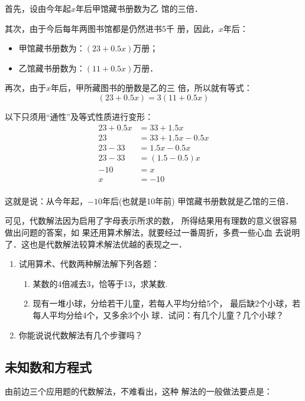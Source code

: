 \begin{solution}
首先，设由今年起$x$年后甲馆藏书册数为乙
馆的三倍．

    其次，由于今后每年两图书馆都是仍然进书5千
册，因此，$x$年后：
\begin{itemize}
    \item 甲馆藏书册数为：$(23 + 0. 5x)$万册；
    \item  乙馆藏书册数为：$(11+0.5x)$万册．
\end{itemize}

    再次，由于$x$年后，甲所藏图书的册数是乙的三
倍，所以就有等式：
\[(23 + 0. 5x)=3(11+0.5x) \]

以下只须用“通性”及等式性质进行变形：
\begin{align*}
    23 + 0. 5x& =33+1.5x \tag{分配律}\\
23&=33+1.5x-0.5x  \tag{两边同减$0.5x$}\\
23-33&=1.5x-0. 5x  \tag{两边同减33}\\
23-33&=(1.5-0.5) x  \tag{分配律}\\
-10&=x  \tag{减法法则}\\
x&=-10  \tag{两边调换位置}\\
\end{align*}
    
这就是说：从今年起，$-10$年后(也就是10年前)
甲馆藏书册数就是乙馆的三倍．
\end{solution}

    可见，代数解法因为启用了字母表示所求的数，
所得结果用有理数的意义很容易做出问题的答案，如
果还用算术解法，就要经过一番周折，多费一些心血
去说明了．这也是代数解法较算术解法优越的表现之一．

\begin{ex}
\begin{enumerate}
    \item 试用算术、代数两种解法解下列各题：
    \begin{enumerate}
        \item 某数的4倍减去3，恰等于13，求某数.
        \item 现有一堆小球，分给若干儿童，若每人平均分给5个，
    最后缺2个小球，若每人平均分给4个，又多余3个小
    球．试问：有几个儿童？几个小球？
    \end{enumerate}

    \item 你能说说代数解法有几个步骤吗？
\end{enumerate}
\end{ex}
    
\subsection{未知数和方程式}
  由前边三个应用题的代数解法，不难看出，这种
解法的一般做法要点是：


